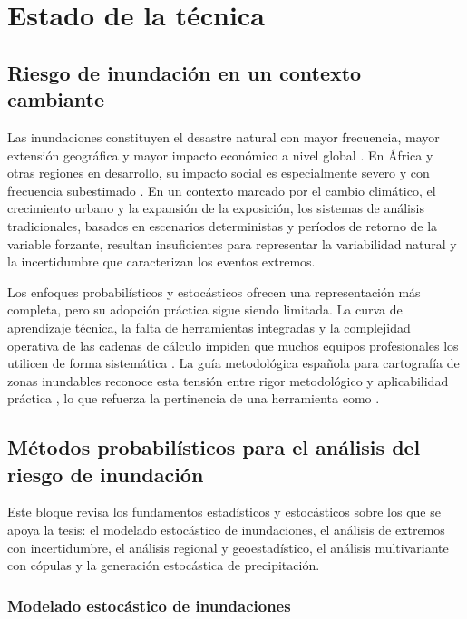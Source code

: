 \chapter{Estado de la técnica}
\label{ch:estado_arte}

\section{Riesgo de inundación en un contexto cambiante}

Las inundaciones constituyen el desastre natural con mayor frecuencia, mayor extensión geográfica y mayor impacto económico a nivel global \parencite{najibi2018global}. En África y otras regiones en desarrollo, su impacto social es especialmente severo y con frecuencia subestimado \parencite{dibaldassarre2010}. En un contexto marcado por el cambio climático, el crecimiento urbano y la expansión de la exposición, los sistemas de análisis tradicionales, basados en escenarios deterministas y períodos de retorno de la variable forzante, resultan insuficientes para representar la variabilidad natural y la incertidumbre que caracterizan los eventos extremos.

Los enfoques probabilísticos y estocásticos ofrecen una representación más completa, pero su adopción práctica sigue siendo limitada. La curva de aprendizaje técnica, la falta de herramientas integradas y la complejidad operativa de las cadenas de cálculo impiden que muchos equipos profesionales los utilicen de forma sistemática \parencite{dibaldassarre2010}. La guía metodológica española para cartografía de zonas inundables reconoce esta tensión entre rigor metodológico y aplicabilidad práctica \parencite{marm2011guia}, lo que refuerza la pertinencia de una herramienta como \hydra.

\section{Métodos probabilísticos para el análisis del riesgo de inundación}
\label{sec:metodos_probabilisticos}

Este bloque revisa los fundamentos estadísticos y estocásticos sobre los que se apoya la tesis: el modelado estocástico de inundaciones, el análisis de extremos con incertidumbre, el análisis regional y geoestadístico, el análisis multivariante con cópulas y la generación estocástica de precipitación.

\subsection{Modelado estocástico de inundaciones}
\label{sec:modelado_estocastico}

